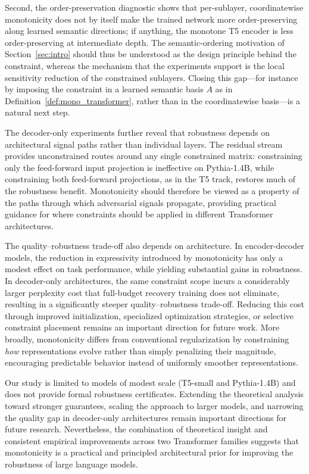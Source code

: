 \documentclass{article}
\theoremstyle{plain}
\theoremstyle{definition}
\theoremstyle{remark}
\begin{document}
Second, the order-preservation diagnostic shows that per-sublayer, coordinatewise monotonicity does not by itself make the trained network more order-preserving along learned semantic directions; if anything, the monotone T5 encoder is less order-preserving at intermediate depth. The semantic-ordering motivation of Section~\ref{sec:intro} should thus be understood as the design principle behind the constraint, whereas the mechanism that the experiments support is the local sensitivity reduction of the constrained sublayers. Closing this gap---for instance by imposing the constraint in a learned semantic basis $A$ as in Definition~\ref{def:mono_transformer}, rather than in the coordinatewise basis---is a natural next step.

The decoder-only experiments further reveal that robustness depends on architectural signal paths rather than individual layers. The residual stream provides unconstrained routes around any single constrained matrix: constraining only the feed-forward input projection is ineffective on Pythia-1.4B, while constraining both feed-forward projections, as in the T5 track, restores much of the robustness benefit.
Monotonicity should therefore be viewed as a property of the paths through which adversarial signals propagate, providing practical guidance for where constraints should be applied in different Transformer architectures.

The quality--robustness trade-off also depends on architecture. In encoder-decoder models, the reduction in expressivity
introduced by monotonicity has only a modest effect on task
performance, while yielding substantial gains in robustness. In
decoder-only architectures, the same constraint scope incurs a
considerably larger perplexity cost that full-budget recovery
training does not eliminate, resulting in a significantly steeper
quality--robustness trade-off.
Reducing this cost through improved initialization, specialized optimization strategies, or selective constraint placement remains an important direction for future work. More broadly, monotonicity differs from conventional regularization by constraining \emph{how} representations evolve rather than simply penalizing their magnitude, encouraging predictable behavior instead of uniformly smoother representations.

Our study is limited to models of modest scale (T5-small and Pythia-1.4B) and does not provide formal robustness certificates. Extending the theoretical analysis toward stronger guarantees, scaling the approach to larger models, and narrowing the quality gap in decoder-only architectures remain important directions for future research. Nevertheless, the combination of theoretical insight and consistent empirical improvements across two Transformer families suggests that monotonicity is a practical and principled architectural prior for improving the robustness of large language models.
\end{document}
